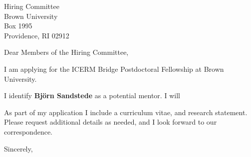 \documentclass[11pt,a4paper]{letter}
\begin{document}

\def\School{Brown University}

\begin{letter}
{Hiring Committee\\
Brown University\\
Box 1995\\
Providence, RI 02912}


\opening{Dear Members of the Hiring Committee,}

I am applying for the ICERM Bridge Postdoctoral Fellowship at \School. 



I identify \textbf{Bj\"{o}rn Sandstede} as a potential mentor. I will 

As part of my application I include a curriculum vitae, and research statement. Please request additional details as needed, and I look forward to our correspondence.

\closing{Sincerely,}
\end{letter}
\end{document}
